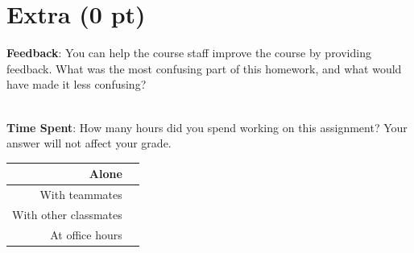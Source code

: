 \documentclass[12pt]{article}
\begin{document}
\section*{Extra (0 pt)}

\textbf{Feedback}: You can help the course staff improve the course by providing feedback. What was the most confusing part of this homework, and what would have made it less confusing?

\begin{tcolorbox}[fit,height=10em, width=40em, blank, borderline={1pt}{1pt},nobeforeafter]
            \begin{center}
            \end{center}
            \end{tcolorbox}\\

\noindent\textbf{Time Spent}: How many hours did you spend working on this assignment? Your answer will not affect your grade.

\begin{tcolorbox}[fit,height=8em, width=40em, blank, borderline={1pt}{1pt},nobeforeafter]
\begin{table}[H]
    \centering
    \begin{tabular}{r|c}
        Alone &  \hspace{3em}  %
        \\ \hline
        With teammates & \hspace{3em}  %
        \\ \hline
        With other classmates & \hspace{3em}  %
        \\ \hline
        At office hours & \hspace{3em}  %
        \\ \hline
    \end{tabular}
        
\end{table}
\end{tcolorbox}
\end{document}
